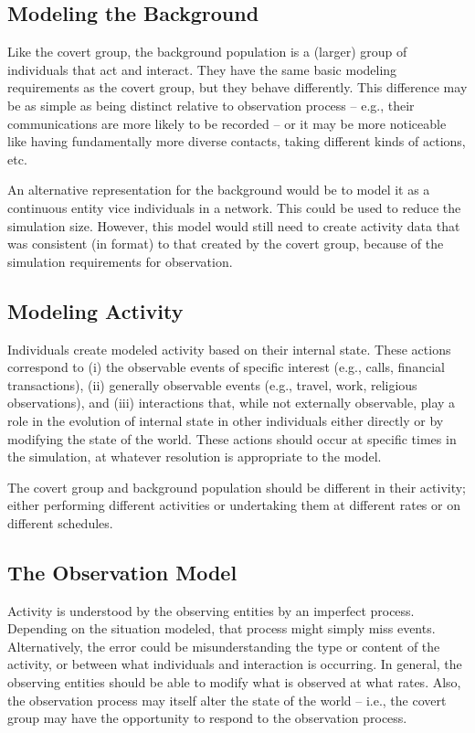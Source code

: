 \documentclass{article}
\begin{document}
\subsection*{Modeling the Background}
Like the covert group, the background population is a (larger) group of individuals that act and interact.  They have the same basic modeling requirements as the covert group, but they behave differently.  This difference may be as simple as being distinct relative to observation process -- e.g., their communications are more likely to be recorded -- or it may be more noticeable like having fundamentally more diverse contacts, taking different kinds of actions, etc.

An alternative representation for the background would be to model it as a continuous entity vice individuals in a network.  This could be used to reduce the simulation size.  However, this model would still need to create activity data that was consistent (in format) to that created by the covert group, because of the simulation requirements for observation.

\subsection*{Modeling Activity}
Individuals create modeled activity based on their internal state.  These actions correspond to (i) the observable events of specific interest (e.g., calls, financial transactions), (ii) generally observable events (e.g., travel, work, religious observations), and (iii) interactions that, while not externally observable, play a role in the evolution of internal state in other individuals either directly or by modifying the state of the world.  These actions should occur at specific times in the simulation, at whatever resolution is appropriate to the model.

The covert group and background population should be different in their activity; either performing different activities or undertaking them at different rates or on different schedules.

\subsection*{The Observation Model}
Activity is understood by the observing entities by an imperfect process.  Depending on the situation modeled, that process might simply miss events.  Alternatively, the error could be misunderstanding the type or content of the activity, or between what individuals and interaction is occurring.  In general, the observing entities should be able to modify what is observed at what rates.  Also, the observation process may itself alter the state of the world -- i.e., the covert group may have the opportunity to respond to the observation process.
\end{document}
